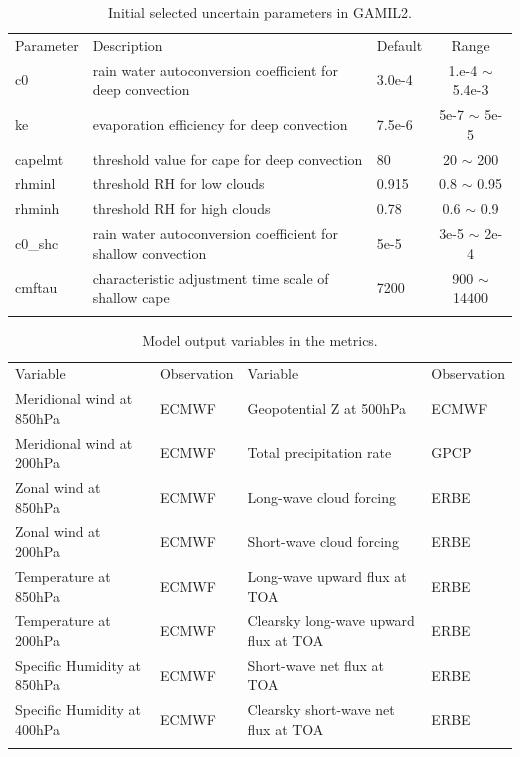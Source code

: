 \documentclass[gmd, manuscript]{copernicus}
\begin{document}
\begin{table}[t]
\caption{Initial selected uncertain parameters in GAMIL2.}
\begin{tabular}{l l l c}
\tophline
Parameter & Description & Default & Range \\
\middlehline
c0 & rain water autoconversion coefficient for deep convection & 3.0e-4 & 1.e-4 $\sim$ 5.4e-3 \\
ke & evaporation efficiency for deep convection & 7.5e-6 & 5e-7 $\sim$ 5e-5 \\
capelmt & threshold value for cape for deep convection & 80 & 20 $\sim$ 200 \\
rhminl & threshold RH for low clouds & 0.915 & 0.8 $\sim$ 0.95 \\
rhminh & threshold RH for high clouds & 0.78 & 0.6 $\sim$ 0.9 \\
c0\_shc & rain water autoconversion coefficient for shallow convection & 5e-5 & 3e-5 $\sim$ 2e-4 \\
cmftau & characteristic adjustment time scale of shallow cape & 7200 & 900 $\sim$ 14400 \\
\bottomhline
\end{tabular}
\belowtable{} %
\end{table}

\begin{table}[t]
\caption{Model output variables in the metrics.}
\begin{tabular}{l l l l}
\tophline
Variable & Observation & Variable & Observation \\
\middlehline
Meridional wind at 850hPa   & ECMWF & Geopotential Z at 500hPa              & ECMWF \\
Meridional wind at 200hPa   & ECMWF & Total precipitation rate              & GPCP \\
Zonal wind at 850hPa        & ECMWF & Long-wave cloud forcing                & ERBE \\
Zonal wind at 200hPa        & ECMWF & Short-wave cloud forcing               & ERBE \\
Temperature at 850hPa       & ECMWF & Long-wave upward flux at TOA          & ERBE \\
Temperature at 200hPa       & ECMWF & Clearsky long-wave upward flux at TOA & ERBE \\
Specific Humidity at 850hPa & ECMWF & Short-wave net flux at TOA            & ERBE \\
Specific Humidity at 400hPa & ECMWF & Clearsky short-wave net flux at TOA   & ERBE \\
\bottomhline
\end{tabular}
\belowtable{} %
\end{table}
\end{document}
